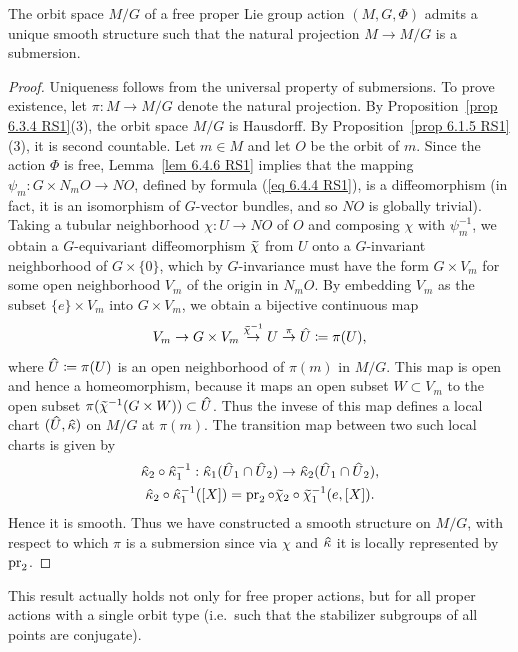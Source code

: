 \begin{cor}[{{\cite[Cor.~6.5.1]{RS1}}}]\label{cor 6.5.1 RS1}
    The orbit space $M\slash G$ of a free proper Lie group action $(M,G,\Phi)$ admits a unique smooth structure such that the natural projection $M\to M\slash G$ is a submersion.
\end{cor}
\begin{proof}
    Uniqueness follows from the universal property of submersions. To prove existence, let $\pi:M\to M\slash G$ denote the natural projection. By Proposition~\ref{prop 6.3.4 RS1}(3), the orbit space $M\slash G$ is Hausdorff. By Proposition~\ref{prop 6.1.5 RS1}(3), it is second countable. Let $m\in M$ and let $O$ be the orbit of $m$. Since the action $\Phi$ is free, Lemma~\ref{lem 6.4.6 RS1} implies that the mapping $\psi_m:G\times N_m O\to NO$, defined by formula (\ref{eq 6.4.4 RS1}), is a diffeomorphism (in fact, it is an isomorphism of $G$-vector bundles, and so $NO$ is globally trivial). Taking a tubular neighborhood $\chi:U\to NO$ of $O$ and composing $\chi$ with $\psi_m^{-1}$, we obtain a $G$-equivariant diffeomorphism $\wt\chi$ from $U$ onto a $G$-invariant neighborhood of $G\times\{0\}$, which by $G$-invariance must have the form $G\times V_m$ for some open neighborhood $V_m$ of the origin in $N_mO$. By embedding $V_m$ as the subset $\{e\}\times V_m$ into $G\times V_m$, we obtain a bijective continuous map
    \[V_m\to G\times V_m\overset{\wt{\chi}^{-1}}{\to}U\overset{\pi}{\to}\wh{U}\coloneqq \pi(U),\]
    where $\wh{U}\coloneqq \pi(U)$ is an open neighborhood of $\pi(m)$ in $M\slash G$. This map is open and hence a homeomorphism, because it maps an open subset $W\subset V_m$ to the open subset $\pi(\wt{\chi}^{-1}(G\times W))\subset \wh{U}$. Thus the invese of this map defines a local chart $(\wh U,\wh \kappa)$ on $M\slash G$ at $\pi(m)$. The transition map between two such local charts is given by
    \begin{gather}
        \wh{\kappa}_2\circ\wh{\kappa}_1^{-1}:\wh{\kappa}_1(\wh{U}_1\cap \wh{U}_2)\to \wh{\kappa}_2(\wh{U}_1\cap \wh{U}_2),\\
        \wh{\kappa}_2\circ\wh{\kappa}_1^{-1}([X])=\pr_2\circ\wt{\chi}_2\circ\wt{\chi}_1^{-1}(e,[X]).
    \end{gather}
    Hence it is smooth. Thus we have constructed a smooth structure on $M\slash G$, with respect to which $\pi$ is a submersion since via $\chi$ and $\wh\kappa$ it is locally represented by $\operatorname{pr}_2$.
\end{proof}

\begin{rem}
    This result actually holds not only for free proper actions, but for all proper actions with a single orbit type (i.e.\ such that the stabilizer subgroups of all points are conjugate).
\end{rem}


